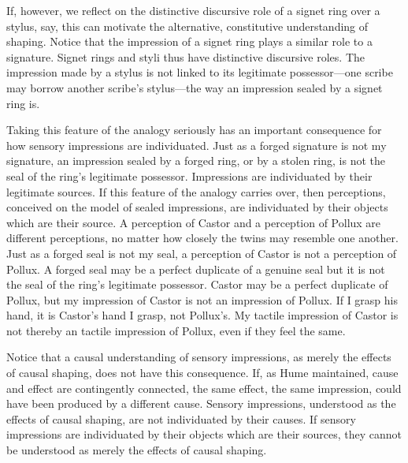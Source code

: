 If, however, we reflect on the distinctive discursive role of a signet ring over a stylus, say, this can motivate the alternative, constitutive understanding of shaping. Notice that the impression of a signet ring plays a similar role to a signature. Signet rings and styli thus have distinctive discursive roles. The impression made by a stylus is not linked to its legitimate possessor---one scribe may borrow another scribe’s stylus---the way an impression sealed by a signet ring is.


Taking this feature of the analogy seriously has an important consequence for how sensory impressions are individuated. Just as a forged signature is not my signature, an impression sealed by a forged ring, or by a stolen ring, is not the seal of the ring’s legitimate possessor. Impressions are individuated by their legitimate sources. If this feature of the analogy carries over, then perceptions, conceived on the model of sealed impressions, are individuated by their objects which are their source. A perception of Castor and a perception of Pollux are different perceptions, no matter how closely the twins may resemble one another. Just as a forged seal is not my seal, a perception of Castor is not a perception of Pollux. A forged seal may be a perfect duplicate of a genuine seal but it is not the seal of the ring’s legitimate possessor. Castor may be a perfect duplicate of Pollux, but my impression of Castor is not an impression of Pollux. If I grasp his hand, it is Castor's hand I grasp, not Pollux's. My tactile impression of Castor is not thereby an tactile impression of Pollux, even if they feel the same.

Notice that a causal understanding of sensory impressions, as merely the effects of causal shaping, does not have this consequence. If, as Hume maintained, cause and effect are contingently connected, the same effect, the same impression, could have been produced by a different cause. Sensory impressions, understood as the effects of causal shaping, are not individuated by their causes. If sensory impressions are individuated by their objects which are their sources, they cannot be understood as merely the effects of causal shaping. 

